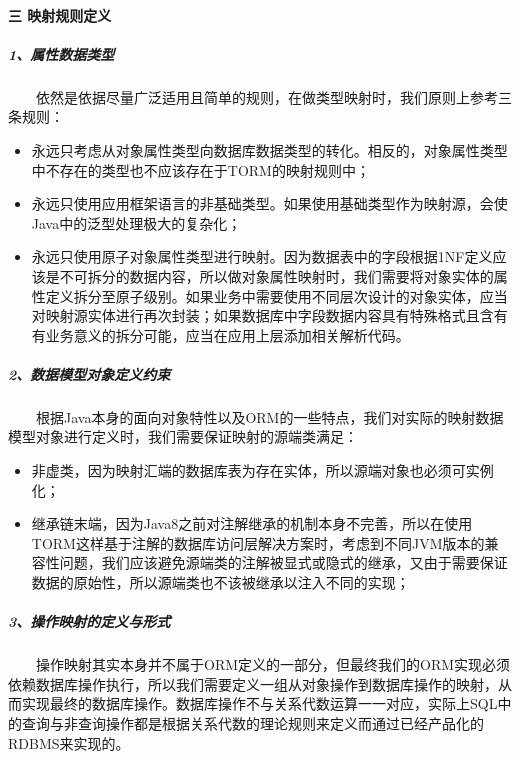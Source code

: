 \documentclass[]{article}
\begin{document}
\paragraph{三
映射规则定义}\label{ux4e09-ux6620ux5c04ux89c4ux5219ux5b9aux4e49}

\subparagraph{1、属性数据类型}\label{ux5c5eux6027ux6570ux636eux7c7bux578b}

　　依然是依据尽量广泛适用且简单的规则，在做类型映射时，我们原则上参考三条规则：

\begin{itemize}
\itemsep1pt\parskip0pt
\item
  永远只考虑从对象属性类型向数据库数据类型的转化。相反的，对象属性类型中不存在的类型也不应该存在于TORM的映射规则中；
\item
  永远只使用应用框架语言的非基础类型。如果使用基础类型作为映射源，会使Java中的泛型处理极大的复杂化；
\item
  永远只使用原子对象属性类型进行映射。因为数据表中的字段根据1NF定义应该是不可拆分的数据内容，所以做对象属性映射时，我们需要将对象实体的属性定义拆分至原子级别。如果业务中需要使用不同层次设计的对象实体，应当对映射源实体进行再次封装；如果数据库中字段数据内容具有特殊格式且含有有业务意义的拆分可能，应当在应用上层添加相关解析代码。
\end{itemize}

\subparagraph{2、数据模型对象定义约束}\label{ux6570ux636eux6a21ux578bux5bf9ux8c61ux5b9aux4e49ux7ea6ux675f}

　　根据Java本身的面向对象特性以及ORM的一些特点，我们对实际的映射数据模型对象进行定义时，我们需要保证映射的源端类满足：

\begin{itemize}
\itemsep1pt\parskip0pt
\item
  非虚类，因为映射汇端的数据库表为存在实体，所以源端对象也必须可实例化；
\item
  继承链末端，因为Java8之前对注解继承的机制本身不完善，所以在使用TORM这样基于注解的数据库访问层解决方案时，考虑到不同JVM版本的兼容性问题，我们应该避免源端类的注解被显式或隐式的继承，又由于需要保证数据的原始性，所以源端类也不该被继承以注入不同的实现；
\end{itemize}

\subparagraph{3、操作映射的定义与形式}\label{ux64cdux4f5cux6620ux5c04ux7684ux5b9aux4e49ux4e0eux5f62ux5f0f}

　　操作映射其实本身并不属于ORM定义的一部分，但最终我们的ORM实现必须依赖数据库操作执行，所以我们需要定义一组从对象操作到数据库操作的映射，从而实现最终的数据库操作。数据库操作不与关系代数运算一一对应，实际上SQL中的查询与非查询操作都是根据关系代数的理论规则来定义而通过已经产品化的RDBMS来实现的。
\end{document}
